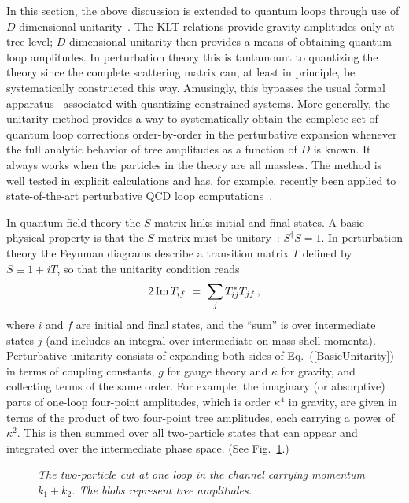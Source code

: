 In this section, the above discussion is extended to quantum loops
through use of $D$-dimensional
unitarity~\cite{Bern94SusyFour,Bern95SusyFour,BernMorgan,Review,Rozowsky}.
The KLT relations provide gravity amplitudes only at tree level;
$D$-dimensional unitarity then provides a means of obtaining quantum
loop amplitudes. In perturbation theory this is tantamount to
quantizing the theory since the complete scattering matrix can, at least in
principle, be systematically constructed this way.  Amusingly, this
bypasses the usual formal
apparatus~\cite{Faddeev74,Fradkin75,Batalin77,Henneaux85} associated
with quantizing constrained systems.  More generally, the unitarity
method provides a way to systematically obtain the complete set of
quantum loop corrections order-by-order in the perturbative expansion
whenever the full analytic behavior of tree amplitudes as a function
of $D$ is known.  It always works when the particles in the theory are
all massless.  The method is well tested in explicit calculations and
has, for example, recently been applied to state-of-the-art perturbative QCD
loop computations~\cite{Bern00QCDApplications,Bern02QCDApplications}.

In quantum field theory the $S$-matrix links initial and final states.
A basic physical property is that the $S$ matrix must be
unitary~\cite{Mandelstam58,Landau59,Mandelstam59,Cutkosky60}: $S^\dag
S = 1$.  In perturbation theory the Feynman diagrams describe a
transition matrix $T$ defined by $S \equiv 1 + i T$, so that the
unitarity condition reads
%
\begin{equation}
 2 \, {\rm Im}\, T_{if}\ =\ \sum_j T^*_{ij} T_{jf} \, , 
\label{BasicUnitarity}
\end{equation}
%
where $i$ and $f$ are initial and final states, and the ``sum'' is over
intermediate states $j$ (and includes an integral over intermediate
on-mass-shell momenta).  Perturbative unitarity consists of expanding
both sides of Eq.~(\ref{BasicUnitarity}) in terms of coupling
constants, $g$ for gauge theory and $\kappa$ for gravity, and
collecting terms of the same order.  For example, the imaginary (or
absorptive) parts of one-loop four-point amplitudes, which is order
$\kappa^4$ in gravity, are given in terms of the product of two
four-point tree amplitudes, each carrying a power of $\kappa^2$.  This
is then summed over all two-particle states that can appear and
integrated over the intermediate phase space. (See
Fig.~\ref{figure:TwoParticle}.)


\begin{figure}[h]
  \def\epsfsize#1#2{0.9#1} \centerline{}
  \caption{\it The two-particle cut at one loop in the channel
  carrying momentum $k_1+k_2$. The blobs represent tree
  amplitudes.}  
\label{figure:TwoParticle}
\end{figure}



